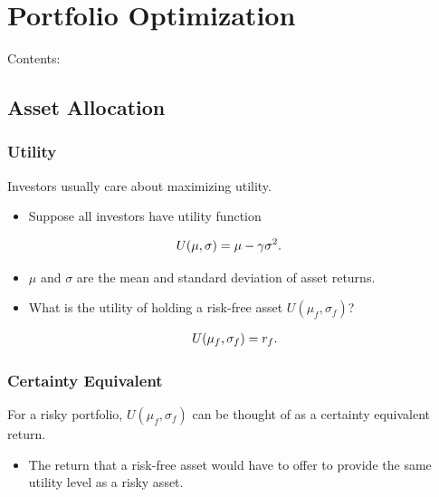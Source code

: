 \documentclass[letterpaper,10pt,english]{sphinxmanual}
\begin{document}
\chapter{Portfolio Optimization}
\label{portfolios:portfolio-optimization}\label{portfolios::doc}
Contents:


\section{Asset Allocation}
\label{allocation:asset-allocation}\label{allocation::doc}

\subsection{Utility}
\label{allocation:utility}
Investors usually care about maximizing utility.
\begin{itemize}
\item {} 
Suppose all investors have utility function

\end{itemize}
\begin{gather}
\begin{split}U(\mu, \sigma) & = \mu - \gamma \sigma^2.\end{split}\notag
\end{gather}\begin{itemize}
\item {} 
$\mu$ and $\sigma$ are the mean and standard deviation
of asset returns.

\end{itemize}
\begin{itemize}
\item {} 
What is the utility of holding a risk-free asset $U(\mu_f,
\sigma_f)$?

\end{itemize}
\begin{gather}
\begin{split}U(\mu_f ,\sigma_f) = r_f.\end{split}\notag
\end{gather}

\subsection{Certainty Equivalent}
\label{allocation:certainty-equivalent}
For a risky portfolio, $U(\mu_f, \sigma_f)$ can be thought of as
a certainty equivalent return.
\begin{itemize}
\item {} 
The return that a risk-free asset would have to offer to provide the
same utility level as a risky asset.

\end{itemize}
\end{document}
